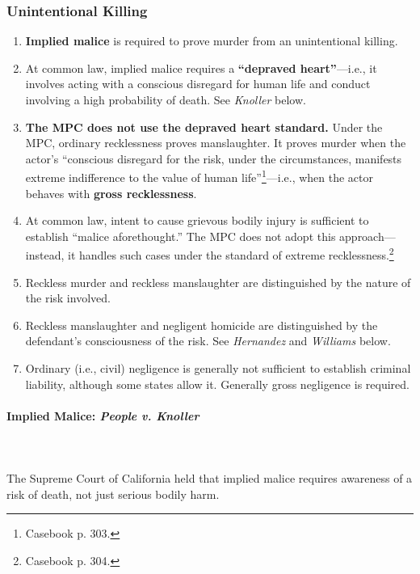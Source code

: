 \subsubsection{Unintentional Killing}

\begin{enumerate}
    \item \textbf{Implied malice} is required to prove murder from an 
    unintentional killing.
    \item At common law, implied malice requires a \textbf{``depraved 
    heart''}---i.e., it involves acting with a conscious disregard for human 
    life and conduct involving a high probability of death. See \emph{Knoller} 
    below.
    \item \textbf{The MPC does not use the depraved heart standard.} Under the 
    MPC, ordinary recklessness proves manslaughter. It proves murder when the 
    actor's ``conscious disregard for the risk, under the circumstances, 
    manifests extreme indifference to the value of human 
    life''\footnote{Casebook p. 303.}---i.e., when the actor behaves with 
    \textbf{gross recklessness}.
    \item At common law, intent to cause grievous bodily injury is sufficient 
    to establish ``malice aforethought.'' The MPC does not adopt this 
    approach---instead, it handles such cases under the standard of extreme 
    recklessness.\footnote{Casebook p. 304.}
    \item Reckless murder and reckless manslaughter are distinguished by the 
    nature of the risk involved.
    \item Reckless manslaughter and negligent homicide are distinguished by 
    the defendant's consciousness of the risk. See \emph{Hernandez} and 
    \emph{Williams} below.
    \item Ordinary (i.e., civil) negligence is generally not sufficient to 
    establish criminal liability, although some states allow it. Generally 
    gross negligence is required.
\end{enumerate}

\paragraph{Implied Malice: \emph{People v. Knoller}}
~\\\\
The Supreme Court of California held that implied malice requires awareness of 
a risk of death, not just serious bodily harm.


